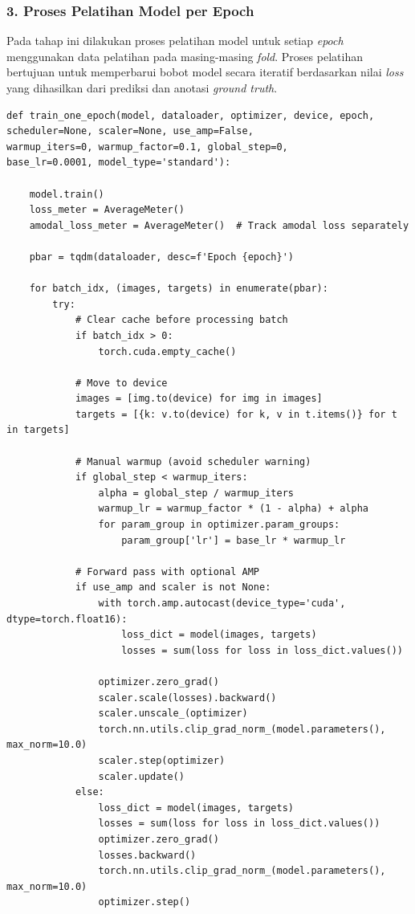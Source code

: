 \subsubsection*{\textnormal{3. Proses Pelatihan Model per Epoch}}
Pada tahap ini dilakukan proses pelatihan model untuk setiap \textit{epoch} menggunakan data pelatihan pada masing-masing \textit{fold}. Proses pelatihan bertujuan untuk memperbarui bobot model secara iteratif berdasarkan nilai \textit{loss} yang dihasilkan dari prediksi dan anotasi \textit{ground truth}. \par

\begin{lstlisting}[caption={Proses Pelatihan Model per Epoch}, label={code:4.train_one_epoch}]
def train_one_epoch(model, dataloader, optimizer, device, epoch,            scheduler=None, scaler=None, use_amp=False,                     warmup_iters=0, warmup_factor=0.1, global_step=0,               base_lr=0.0001, model_type='standard'):

    model.train()
    loss_meter = AverageMeter()
    amodal_loss_meter = AverageMeter()  # Track amodal loss separately
    
    pbar = tqdm(dataloader, desc=f'Epoch {epoch}')
    
    for batch_idx, (images, targets) in enumerate(pbar):
        try:
            # Clear cache before processing batch
            if batch_idx > 0:
                torch.cuda.empty_cache()
            
            # Move to device
            images = [img.to(device) for img in images]
            targets = [{k: v.to(device) for k, v in t.items()} for t in targets]
            
            # Manual warmup (avoid scheduler warning)
            if global_step < warmup_iters:
                alpha = global_step / warmup_iters
                warmup_lr = warmup_factor * (1 - alpha) + alpha
                for param_group in optimizer.param_groups:
                    param_group['lr'] = base_lr * warmup_lr
            
            # Forward pass with optional AMP
            if use_amp and scaler is not None:
                with torch.amp.autocast(device_type='cuda', dtype=torch.float16):
                    loss_dict = model(images, targets)
                    losses = sum(loss for loss in loss_dict.values())
                
                optimizer.zero_grad()
                scaler.scale(losses).backward()
                scaler.unscale_(optimizer)
                torch.nn.utils.clip_grad_norm_(model.parameters(), max_norm=10.0)
                scaler.step(optimizer)
                scaler.update()
            else:
                loss_dict = model(images, targets)
                losses = sum(loss for loss in loss_dict.values())
                optimizer.zero_grad()
                losses.backward()
                torch.nn.utils.clip_grad_norm_(model.parameters(), max_norm=10.0)
                optimizer.step()


\end{lstlisting}
